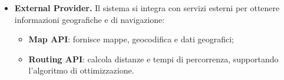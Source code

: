 \begin{itemize}
    \item \textbf{External Provider.}  
    Il sistema si integra con servizi esterni per ottenere informazioni geografiche e di navigazione:
    \begin{itemize}
        \item \textbf{Map API}: fornisce mappe, geocodifica e dati geografici;
        \item \textbf{Routing API}: calcola distanze e tempi di percorrenza, supportando l'algoritmo di ottimizzazione.
    \end{itemize}
    
\end{itemize}
